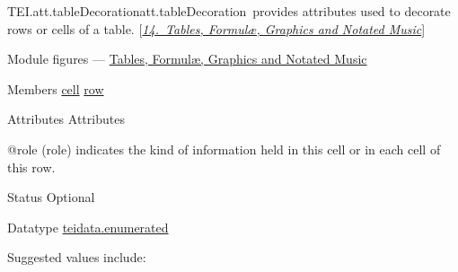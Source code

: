 \begin{reflist}
\item[]\begin{specHead}{TEI.att.tableDecoration}{att.tableDecoration} provides attributes used to decorate rows or cells of a table. [\textit{\hyperref[FT]{14.\ Tables, Formulæ, Graphics and Notated Music}}]\end{specHead} 
    \item[{Module}]
  figures — \hyperref[FT]{Tables, Formulæ, Graphics and Notated Music}
    \item[{Members}]
  \hyperref[TEI.cell]{cell} \hyperref[TEI.row]{row}
    \item[{Attributes}]
  Attributes\hfil\\[-10pt]\begin{sansreflist}
    \item[@role]
  (role) indicates the kind of information held in this cell or in each cell of this row.
\begin{reflist}
    \item[{Status}]
  Optional
    \item[{Datatype}]
  \hyperref[TEI.teidata.enumerated]{teidata.enumerated}
    \item[{Suggested values include:}]
  \begin{description}


\end{description}
\end{reflist}
\end{sansreflist}
\end{reflist}
